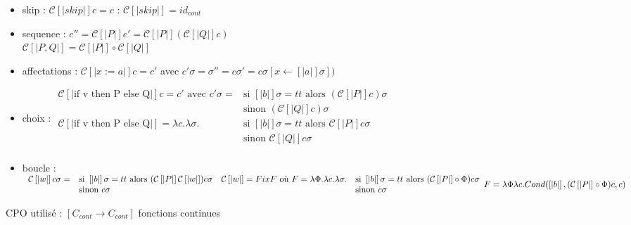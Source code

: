 \documentclass[10pt,a4paper]{article}
\newcommand{\semm}[1]{\left[| #1 | \right]}
\begin{document}
\begin{itemize}
 \item skip : $\mathcal{C}\semm{skip} c = c$ : $\mathcal{C}\semm{skip} = id_{cont}$\\
 \item sequence : $c'' = \mathcal{C}\semm{P} c' = \mathcal{C}\semm{P}(\mathcal{C}\semm{Q} c)$\\
		  $\mathcal{C}\semm{P, Q} = \mathcal{C}\semm{P} \circ \mathcal{C}\semm{Q}$\\
 \item affectations :  $\mathcal{C}\semm{x:=a} c = c'$ avec $c' \sigma = \sigma'' = c \sigma' = c \sigma[x \leftarrow \semm{a} \sigma])$\\
 \item choix : 
$\begin{array}{ll}
\mathcal{C}\semm{\text{if v then P else Q}} c = c'\text{ avec }c' \sigma =&\text{si }\semm{b} \sigma = tt \text{ alors } (\mathcal{C}\semm{P} c) \sigma \\
 &\text{sinon } (\mathcal{C}\semm{Q} c) \sigma\\
   \mathcal{C}\semm{\text{if v then P else Q}} = \lambda c. \lambda \sigma. &\text{si } \semm{b} \sigma = tt\text{ alors } \mathcal{C}\semm{P} c \sigma  \\
 &\text{sinon } \mathcal{C}\semm{Q} c \sigma\\
\end{array}$
 \item boucle : \\$
\begin{array}{ll}
 \mathcal{C}\semm{w} c \sigma = &\text{si } \semm{b} \sigma = tt \text{ alors } (\mathcal{C}\semm{P} \mathcal{C}\semm{w}) c \sigma \\
  &\text{sinon } c \sigma\\
\end{array}\\
\begin{array}{ll}
 \mathcal{C}\semm{w} = Fix F \text{ où } F = \lambda \Phi .  \lambda c. \lambda \sigma. &\text{si } \semm{b} \sigma = tt \text{ alors } (\mathcal{C}\semm{P} \circ \Phi) c \sigma \\
&\text{sinon } c \sigma\\ 
\end{array}\\
F = \lambda \Phi \lambda c . Cond ( \semm{b},  (\mathcal{C}\semm{P} \circ \Phi) c, c)\\
$
\end{itemize}
CPO utilisé : $[C_{cont} \to C_{cont}]$ fonctions continues
\end{document}
